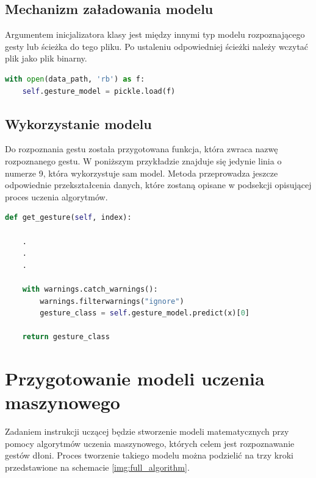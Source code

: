 \subsection{Mechanizm załadowania modelu}

\quad Argumentem inicjalizatora klasy jest między innymi typ modelu rozpoznającego gesty lub ścieżka do tego pliku. Po ustaleniu odpowiedniej ścieżki należy wczytać plik jako plik binarny.  \newline 

\begin{lstlisting}[language=python, style=programming, captionpos=b, caption={Wczytanie modelu}]
with open(data_path, 'rb') as f:
    self.gesture_model = pickle.load(f)
\end{lstlisting}

\subsection{Wykorzystanie modelu}

\quad Do rozpoznania gestu została przygotowana funkcja, która zwraca nazwę rozpoznanego gestu. W poniższym przykładzie znajduje się jedynie linia o numerze 9, która wykorzystuje sam model. Metoda przeprowadza jeszcze odpowiednie przekształcenia danych, które zostaną opisane w podsekcji opisującej proces uczenia algorytmów. \newline

\begin{lstlisting}[language=python, style=programming, captionpos=b, caption={Funkcja zwracająca rozpoznany gest}]
def get_gesture(self, index):

    .
    .
    .

    with warnings.catch_warnings():
        warnings.filterwarnings("ignore")
        gesture_class = self.gesture_model.predict(x)[0]

    return gesture_class
\end{lstlisting}


\newpage
\section{Przygotowanie modeli uczenia maszynowego}

\quad Zadaniem instrukcji uczącej będzie stworzenie modeli matematycznych przy pomocy algorytmów uczenia maszynowego, których celem jest rozpoznawanie gestów dłoni. Proces tworzenie takiego modelu można podzielić na trzy kroki przedstawione na schemacie \ref{img:full_algorithm}. 

